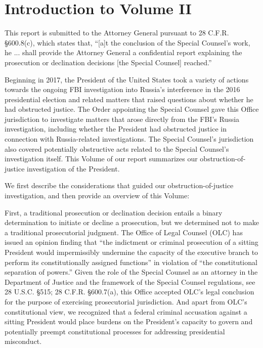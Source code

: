 \section*{Introduction to Volume II}
\label{sec:introduction}

This report is submitted to the Attorney General pursuant to 28 C.F.R. \S 600.8(c), which states that, “[a]t the conclusion of the Special Counsel’s work, he ... shall provide the Attorney General a confidential report explaining the prosecution or declination decisions [the Special Counsel] reached.”

Beginning in 2017, the President of the United States took a variety of actions towards the ongoing FBI investigation into Russia’s interference in the 2016 presidential election and related matters that raised questions about whether he had obstructed justice.
The Order appointing the Special Counsel gave this Office jurisdiction to investigate matters that arose directly from the FBI’s Russia investigation, including whether the President had obstructed justice in connection with Russia-related investigations.
The Special Counsel’s jurisdiction also covered potentially obstructive acts related to the Special Counsel’s investigation itself.
This Volume of our report summarizes our obstruction-of-justice investigation of the President.

We first describe the considerations that guided our obstruction-of-justice investigation, and then provide an overview of this Volume:

First, a traditional prosecution or declination decision entails a binary determination to initiate or decline a prosecution, but we determined not to make a traditional prosecutorial judgment.
The Office of Legal Counsel (OLC) has issued an opinion finding that “the indictment or criminal prosecution of a sitting President would impermissibly undermine the capacity of the executive branch to perform its constitutionally assigned functions” in violation of “the constitutional separation of powers.”%
Given the role of the Special Counsel as an attorney in the Department of Justice and the framework of the Special Counsel regulations, see 28 U.S.C. \S 515; 28 C.F.R. \S 600.7(a), this Office accepted OLC’s legal conclusion for the purpose of exercising prosecutorial jurisdiction.
And apart from OLC’s constitutional view, we recognized that a federal criminal accusation against a sitting President would place burdens on the President’s capacity to govern and potentially preempt constitutional processes for addressing presidential misconduct.%

